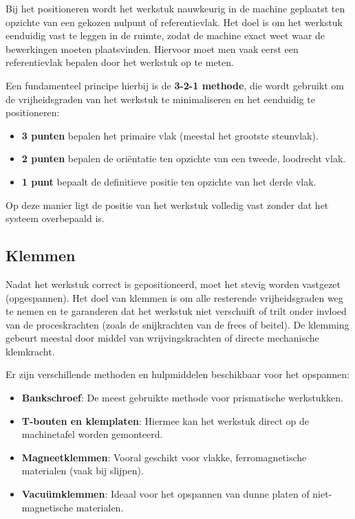 \documentclass[a4paper,12pt,twoside]{report}
\begin{document}
Bij het positioneren wordt het werkstuk nauwkeurig in de machine geplaatst ten opzichte van een gekozen nulpunt of referentievlak. Het doel is om het werkstuk eenduidig vast te leggen in de ruimte, zodat de machine exact weet waar de bewerkingen moeten plaatsvinden. Hiervoor moet men vaak eerst een referentievlak bepalen door het werkstuk op te meten.

Een fundamenteel principe hierbij is de \textbf{3-2-1 methode}, die wordt gebruikt om de vrijheidsgraden van het werkstuk te minimaliseren en het eenduidig te positioneren:
\begin{itemize}
	\item \textbf{3 punten} bepalen het primaire vlak (meestal het grootste steunvlak).
	\item \textbf{2 punten} bepalen de oriëntatie ten opzichte van een tweede, loodrecht vlak.
	\item \textbf{1 punt} bepaalt de definitieve positie ten opzichte van het derde vlak.
\end{itemize}
Op deze manier ligt de positie van het werkstuk volledig vast zonder dat het systeem overbepaald is.


\subsection{Klemmen}
Nadat het werkstuk correct is gepositioneerd, moet het stevig worden vastgezet (opgespannen). Het doel van klemmen is om alle resterende vrijheidsgraden weg te nemen en te garanderen dat het werkstuk niet verschuift of trilt onder invloed van de proceskrachten (zoals de snijkrachten van de frees of beitel). De klemming gebeurt meestal door middel van wrijvingskrachten of directe mechanische klemkracht.

Er zijn verschillende methoden en hulpmiddelen beschikbaar voor het opspannen:
\begin{itemize}
	\item \textbf{Bankschroef}: De meest gebruikte methode voor prismatische werkstukken.
	\item \textbf{T-bouten en klemplaten}: Hiermee kan het werkstuk direct op de machinetafel worden gemonteerd.
	\item \textbf{Magneetklemmen}: Vooral geschikt voor vlakke, ferromagnetische materialen (vaak bij slijpen).
	\item \textbf{Vacuümklemmen}: Ideaal voor het opspannen van dunne platen of niet-magnetische materialen.
\end{itemize}
\end{document}
